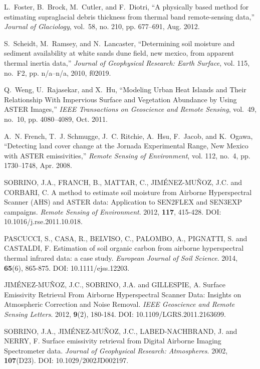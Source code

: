 \begin{thebibliography}{10}
L.~Foster, B.~Brock, M.~Cutler, and F.~Diotri, ``A physically based method for
  estimating supraglacial debris thickness from thermal band remote-sensing
  data,'' \emph{Journal of Glaciology}, vol.~58, no. 210, pp. 677--691, Aug.
  2012.

S.~Scheidt, M.~Ramsey, and N.~Lancaster, ``Determining soil moisture and
  sediment availability at white sands dune field, new mexico, from apparent
  thermal inertia data,'' \emph{Journal of Geophysical Research: Earth
  Surface}, vol. 115, no.~F2, pp. n/a--n/a, 2010, f02019.

Q.~Weng, U.~Rajasekar, and X.~Hu, ``Modeling {Urban} {Heat} {Islands} and
  {Their} {Relationship} {With} {Impervious} {Surface} and {Vegetation}
  {Abundance} by {Using} {ASTER} {Images},'' \emph{IEEE Transactions on
  Geoscience and Remote Sensing}, vol.~49, no.~10, pp. 4080--4089, Oct. 2011.

A.~N. French, T.~J. Schmugge, J.~C. Ritchie, A.~Hsu, F.~Jacob, and K.~Ogawa,
  ``Detecting land cover change at the {Jornada} {Experimental} {Range}, {New}
  {Mexico} with {ASTER} emissivities,'' \emph{Remote Sensing of Environment},
  vol. 112, no.~4, pp. 1730--1748, Apr. 2008.
	
	
 SOBRINO, J.A., FRANCH, B., MATTAR, C., JIMÉNEZ-MUÑOZ, J.C. and CORBARI, C. A method to estimate soil moisture from Airborne Hyperspectral Scanner (AHS) and ASTER data: Application to SEN2FLEX and SEN3EXP campaigns. \textit{Remote Sensing of Environment}. 2012, \textbf{117}, 415-428. DOI: 10.1016/j.rse.2011.10.018.

 PASCUCCI, S., CASA, R., BELVISO, C., PALOMBO, A., PIGNATTI, S. and CASTALDI, F. Estimation of soil organic carbon from airborne hyperspectral thermal infrared data: a case study. \textit{European Journal of Soil Science}. 2014, \textbf{65}(6), 865-875. DOI: 10.1111/ejss.12203.

 JIMÉNEZ-MUÑOZ, J.C., SOBRINO, J.A. and GILLESPIE, A. Surface Emissivity Retrieval From Airborne Hyperspectral Scanner Data: Insights on Atmospheric Correction and Noise Removal. \textit{IEEE Geoscience and Remote Sensing Letters}. 2012, \textbf{9}(2), 180-184. DOI: 10.1109/LGRS.2011.2163699.

 SOBRINO, J.A., JIMÉNEZ-MUÑOZ, J.C., LABED-NACHBRAND, J. and NERRY, F. Surface emissivity retrieval from Digital Airborne Imaging Spectrometer data. \textit{Journal of Geophysical Research: Atmospheres}. 2002, \textbf{107}(D23). DOI: 10.1029/2002JD002197.


\end{thebibliography}
